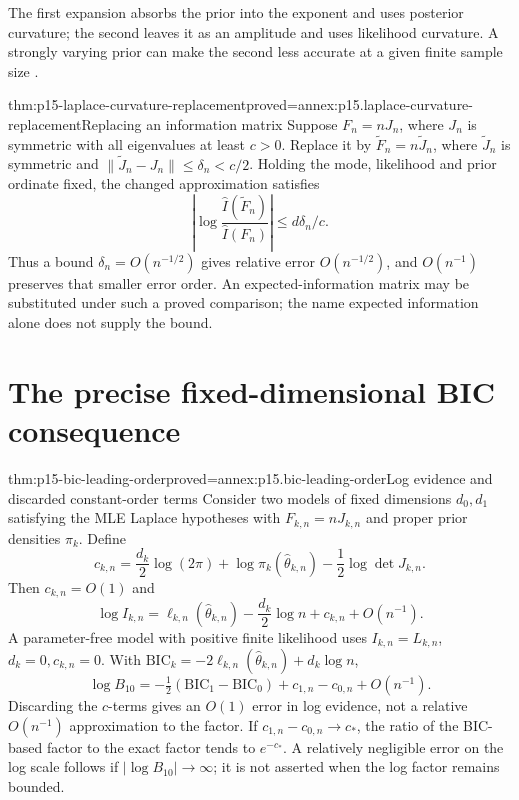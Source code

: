 The first expansion absorbs the prior into the exponent and uses posterior
curvature; the second leaves it as an amplitude and uses likelihood
curvature. A strongly varying prior can make the second less accurate at a
given finite sample size \cite[Secs.~4.1.1--4.1.2]{KassRaftery1995BayesFactors}.

\begin{hblemma}{thm:p15-laplace-curvature-replacement}{proved=annex:p15.laplace-curvature-replacement}{Replacing an information matrix}
Suppose \(F_n=nJ_n\), where \(J_n\) is symmetric with all eigenvalues
at least \(c>0\).
Replace it by \(\widetilde F_n=n\widetilde J_n\), where
\(\widetilde J_n\) is symmetric and
\(\|\widetilde J_n-J_n\|\leq\delta_n<c/2\). Holding the mode, likelihood
and prior ordinate fixed, the changed approximation satisfies
\[
 \left|\log\frac{\widehat I(\widetilde F_n)}
                         {\widehat I(F_n)}\right|
 \leq d\delta_n/c.
\]
Thus a bound \(\delta_n=O(n^{-1/2})\) gives relative error
\(O(n^{-1/2})\), and \(O(n^{-1})\) preserves that smaller error order.
An expected-information matrix may be substituted under such a proved
comparison; the name expected information alone does not supply the bound.
\end{hblemma}

\section{The precise fixed-dimensional BIC consequence}
\label{sec:p15-bic-consequence}

\begin{hbtheorem}{thm:p15-bic-leading-order}{proved=annex:p15.bic-leading-order}{Log evidence and discarded constant-order terms}
Consider two models of fixed dimensions \(d_0,d_1\) satisfying the MLE
Laplace hypotheses with \(F_{k,n}=nJ_{k,n}\) and proper prior densities
\(\pi_k\). Define
\[
 c_{k,n}=\frac{d_k}{2}\log(2\pi)+\log\pi_k(\widehat\theta_{k,n})
                         -\frac12\log\det J_{k,n}.
\]
Then \(c_{k,n}=O(1)\) and
\[
 \log I_{k,n}
 =\ell_{k,n}(\widehat\theta_{k,n})-\frac{d_k}{2}\log n
                +c_{k,n}+O(n^{-1}).
\]
A parameter-free model with positive finite likelihood uses
\(I_{k,n}=L_{k,n}\), \(d_k=0,c_{k,n}=0\).
With
\(\mathrm{BIC}_k=-2\ell_{k,n}(\widehat\theta_{k,n})+d_k\log n\),
\[
 \log B_{10}
 =-\tfrac12(\mathrm{BIC}_1-\mathrm{BIC}_0)
                     +c_{1,n}-c_{0,n}+O(n^{-1}).
\]
Discarding the \(c\)-terms gives an \(O(1)\) error in log evidence,
not a relative \(O(n^{-1})\) approximation to the factor. If
\(c_{1,n}-c_{0,n}\to c_*\), the ratio of the BIC-based factor to
the exact factor tends to \(e^{-c_*}\). A relatively negligible error on
the log scale follows if \(|\log B_{10}|\to\infty\); it is not asserted
when the log factor remains bounded.
\end{hbtheorem}

